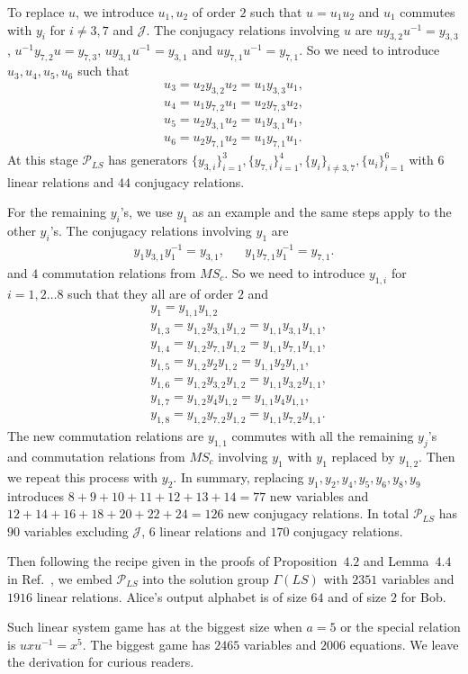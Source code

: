 \documentclass[11pt,letterpaper]{article}
\newcommand{\1}{\mathbb{1}}
\newcommand{\Pg}{\mathcal{P}}
\newcommand{\J}{\mathcal{J}}
\newcommand{\MS}{MS}
\newcommand{\LS}{LS}
\theoremstyle{definition}
\begin{document}
To replace $u$, we introduce $u_1, u_2$ of order $2$ such that $u = u_1u_2$ and $u_1$ commutes with
$y_i$ for $i \neq 3,7$ and $\J$.
The conjugacy relations involving $u$ are $uy_{3,2}u^{-1} = y_{3,3}$, $u^{-1}y_{7,2}u = y_{7,3}$,
$uy_{3,1}u^{-1} = y_{3,1}$ and $uy_{7,1}u^{-1} = y_{7,1}$. So we need to introduce $u_3,u_4,u_5,u_6$ such that 
\begin{align*}
	u_3 = u_2y_{3,2}u_2 = u_1y_{3,3}u_1, \\
	u_4 = u_1y_{7,2}u_1 = u_2y_{7,3}u_2,\\
	u_5 = u_2y_{3,1}u_2 = u_1y_{3,1}u_1,\\
	u_6 = u_2y_{7,1}u_2 = u_1y_{7,1}u_1.
\end{align*}
At this stage $\Pg_{\LS}$ has generators $\{y_{3,i}\}_{i=1}^3, \{ y_{7,i} \}_{i=1}^4, \{y_i\}_{i\neq 3, 7}, \{u_i\}_{i=1}^6$ with $6$ linear relations and $44$ conjugacy relations. 

For the remaining $y_i$'s, we use $y_1$ as an example and the same steps apply to the other $y_i$'s.
The conjugacy relations involving $y_1$ are 
\begin{align*}
	y_{1}y_{3,1} y_1^{-1} = y_{3,1},
	&&y_{1}y_{7,1}y_1^{-1} = y_{7,1}.
\end{align*}
and $4$ commutation relations from $\MS_c$.
So we need to introduce $y_{1,i}$ for $i = 1, 2 \dots 8$ such that they all are of order $2$ and
\begin{align*}
&y_1= y_{1,1} y_{1,2}\\
&y_{1,3} = y_{1,2} y_{3,1}y_{1,2} = y_{1,1} y_{3,1}y_{1,1},\\
&y_{1,4} = y_{1,2} y_{7,1}y_{1,2} = y_{1,1} y_{7,1}y_{1,1},\\
&y_{1,5} = y_{1,2} y_{2}y_{1,2} = y_{1,1} y_{2}y_{1,1},\\
&y_{1,6} = y_{1,2} y_{3,2}y_{1,2} = y_{1,1} y_{3,2}y_{1,1},\\
&y_{1,7} = y_{1,2} y_{4}y_{1,2} = y_{1,1} y_{4}y_{1,1},\\
&y_{1,8} = y_{1,2} y_{7,2}y_{1,2} = y_{1,1} y_{7,2}y_{1,1}.
\end{align*}
The new commutation relations are $y_{1,1}$ commutes with all the remaining $y_j$'s
and commutation relations from $\MS_c$ involving $y_1$ with $y_1$ replaced by $y_{1,2}$.
Then we repeat this process with $y_2$.
In summary, replacing $y_1,y_2,y_4,y_5,y_6,y_8,y_9$ introduces $8+9+10+11+12+13+14 = 77$ new variables 
and $12+14+16+18+20+22+24 = 126$ new conjugacy relations. 
In total $\Pg_{\LS}$ has $90$ variables excluding $\J$, $6$ linear relations and $170$ conjugacy relations.

Then following the recipe given in the proofs of Proposition~$4.2$ and Lemma~$4.4$ in Ref.~\cite{slofstra2017}, 
we embed $\Pg_{\LS}$ into the solution 
group $\Gamma(\LS)$ with $2351$ variables and $1916$ linear relations. 
Alice's output alphabet is of size $64$ and of size $2$ for Bob.

Such linear system game has at the biggest size when $a = 5$ or the special relation is $uxu^{-1} = x^5$.
The biggest game has $2465$ variables and $2006$ equations. We leave the derivation for curious readers.
\end{document}
